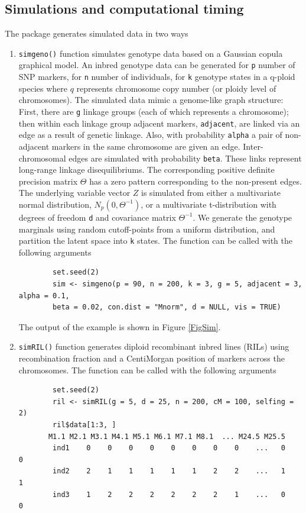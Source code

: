 \subsection{Simulations and computational timing} 
The package generates simulated data in two ways
\begin{enumerate} %
	\item {\tt simgeno()} function simulates genotype data based on a Gaussian copula graphical model. An inbred genotype data can be generated for {\tt p} number of SNP markers, for {\tt n} number of individuals, for {\tt k} genotype states in a q-ploid species where $q$ represents chromosome copy number (or ploidy level of chromosomes). The simulated data mimic a genome-like graph structure: First, there are {\tt g} linkage groups (each of which represents a chromosome); then within each linkage group adjacent markers, {\tt adjacent}, are linked via an edge as a result of genetic linkage. Also, with probability {\tt alpha} a pair of non-adjacent markers in the same chromosome are given an edge. Inter-chromosomal edges are simulated with probability {\tt beta}. These links represent long-range linkage disequilibriums. The corresponding positive definite precision matrix $\Theta$ has a zero pattern corresponding to the non-present edges. The underlying variable vector $Z$ is simulated from either a multivariate normal distribution, $N_p (0, \Theta^{-1})$, or a multivariate t-distribution with degrees of freedom {\tt d} and covariance matrix $\Theta^{-1}$. We generate the genotype marginals using random cutoff-points from a uniform distribution, and partition the latent space into {\tt k} states. The function can be called with the following arguments
	
	
	\begin{verbatim}
		set.seed(2)
		sim <- simgeno(p = 90, n = 200, k = 3, g = 5, adjacent = 3, alpha = 0.1, 
		beta = 0.02, con.dist = "Mnorm", d = NULL, vis = TRUE)
	\end{verbatim}	
	
	The output of the example is shown in Figure \ref{FigSim}.
	\item {\tt simRIL()} function generates diploid recombinant inbred lines (RILs) using recombination fraction and a CentiMorgan position of markers across the chromosomes. The function can be called with the following arguments
	
	\begin{verbatim}
		set.seed(2)
		ril <- simRIL(g = 5, d = 25, n = 200, cM = 100, selfing = 2)
		ril$data[1:3, ]
       M1.1 M2.1 M3.1 M4.1 M5.1 M6.1 M7.1 M8.1  ... M24.5 M25.5 
		ind1    0    0    0    0    0    0    0    0    ...   0     0          
		ind2    2    1    1    1    1    1    2    2    ...   1     1         
		ind3    1    2    2    2    2    2    2    1    ...   0     0
	\end{verbatim}


\end{enumerate}
